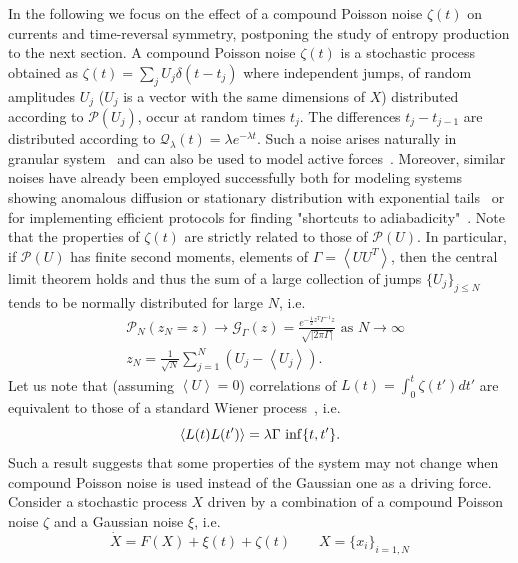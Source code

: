 \documentclass[12pt]{iopart}
\newcommand{\lx} {\left}
\newcommand{\rx} {\right}
\newcommand{\ave}[1] {\lx\langle #1 \rx\rangle}
\newcommand{\cP} {\mathcal{P}}
\newcommand{\cG} {\mathcal{G}}
\newcommand{\cQ} {\mathcal{Q}}
\begin{document}
In the following we focus on the effect of a compound Poisson noise  $\zeta(t)$ on currents and time-reversal symmetry, postponing  the study of entropy production to the next section.
A compound Poisson noise $\zeta(t)$ is a stochastic process obtained as $\zeta(t) = \sum_j U_j \delta(t-t_j)$ where independent jumps, of random amplitudes ${U_j}$ ($U_j$ is a vector with the same dimensions of $X$) distributed according to $\mathcal{P}(U_j)$, occur at random times ${t_j}$. 
The differences $t_j-t_{j-1}$ are distributed according to $\cQ_\lambda(t)=\lambda e^{-\lambda t}$.
Such a noise arises naturally in granular system~\cite{kanazawa2012stochastic,kanazawa2015minimal,kanazawa2015asymptotic,kanazawa2017statistical,lucente2023revealing} and can also be used to model active forces~\cite{zakine2017stochastic,fodor2018non,bialas2023mechanism}. Moreover, similar noises have already been employed successfully both for modeling systems showing anomalous diffusion or stationary distribution with exponential tails~\cite{eliazar2003levy,barkai2020packets} or for implementing efficient protocols for finding "shortcuts to adiabadicity"~\cite{baldovin2022shortcuts}. 
Note that the properties of $\zeta(t)$ are strictly related to those of $\cP(U)$. In particular, if $\cP(U)$ has finite second moments, elements of $\Gamma=\ave{UU^T}$, then the central limit theorem holds and thus the sum of a large collection of jumps $\{U_j\}_{j\le N}$ tends to be normally distributed for large $N$, i.e.
\begin{align}
&\cP_N(z_N=z)\to\cG_\Gamma(z) = \frac{e^{-\frac{1}{2}z^T\Gamma^{-1}z}}{\sqrt{|2\pi\Gamma|}} \text{ as } N\to \infty\\
&z_N=\frac{1}{\sqrt{N}}\sum_{j=1}^N (U_j-\ave{U_j}).
\end{align}
Let us note that (assuming $\ave{U}=0$) correlations of $L(t)=\int_{0}^{t}\zeta(t')dt'$ are equivalent to those of a standard Wiener process~\textcolor{black}{\cite{rice1944mathematical,rice1945mathematical,hanggi1980langevin,van1983relation}}, i.e.
\begin{equation}
    \ave{L(t)L(t')} = \lambda \Gamma \,\,{\rm inf}\{t,t'\}.
\end{equation}
Such a result suggests that some properties of the system may not change when compound Poisson noise is used instead of the Gaussian one as a driving force. \\
Consider a stochastic process $X$ driven by a combination of a compound Poisson noise $\zeta$ and a Gaussian noise $\xi$, i.e.
\begin{equation}
    \dot{X} = F(X) + \xi(t) + \zeta(t) \qquad X=\{x_i\}_{i=1,N}
    \label{eq:Poisson_sde}
\end{equation}
\end{document}

